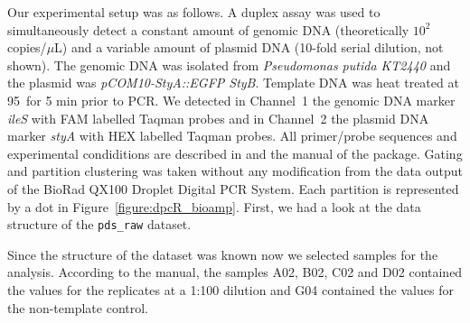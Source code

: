 Our experimental setup was as follows. A duplex assay was used to simultaneously 
detect a constant amount of genomic DNA (theoretically $10^{2}$ copies/$\mu$L) 
and a variable amount of plasmid DNA (10-fold serial dilution, not shown). The 
genomic DNA was isolated from \textit{Pseudomonas putida KT2440} and the plasmid 
was \textit{pCOM10-StyA::EGFP StyB}. Template DNA was heat treated at 
95\textcelsius~for 5 min prior to PCR. We detected in Channel~1 the genomic DNA 
marker \textit{ileS} with FAM labelled Taqman probes and in Channel~2 the 
plasmid DNA marker \textit{styA} with HEX labelled Taqman probes. All 
primer/probe sequences and experimental condiditions are described in 
\citep{jahn_2013, jahn_2014} and the manual of the  package. 
Gating and partition clustering was taken without any modification from the data 
output of the BioRad QX100 Droplet  Digital PCR System. Each partition is 
represented by a dot in Figure~\ref{figure:dpcR_bioamp}. First, we had a look at 
the data structure of the \texttt{pds\_raw} dataset.


Since the structure of the dataset was known now we selected samples for the 
analysis. According to the  manual, the samples A02, 
B02, C02 and D02 contained the values for the replicates at a 1:100 dilution 
and G04 contained the values for the non-template control.

